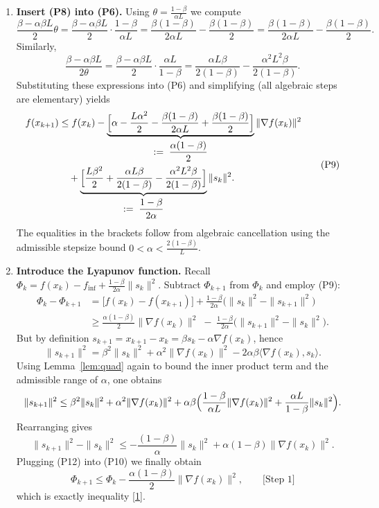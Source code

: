 \documentclass{article}
\begin{document}
\begin{enumerate}
\item\textbf{Insert (P8) into (P6).}  
Using $\theta=\frac{1-\beta}{\alpha L}$ we compute
\[
\frac{\beta-\alpha\beta L}{2}\theta
= \frac{\beta-\alpha\beta L}{2}\cdot\frac{1-\beta}{\alpha L}
= \frac{\beta(1-\beta)}{2\alpha L}-\frac{\beta(1-\beta)}{2}= \frac{\beta(1-\beta)}{2\alpha L}-\frac{\beta(1-\beta)}{2}.
\]
Similarly,
\[
\frac{\beta-\alpha\beta L}{2\theta}
= \frac{\beta-\alpha\beta L}{2}\cdot\frac{\alpha L}{1-\beta}
= \frac{\alpha L\beta}{2(1-\beta)}-\frac{\alpha^{2}L^{2}\beta}{2(1-\beta)}.
\]
Substituting these expressions into (P6) and simplifying (all algebraic steps are elementary) yields
\[
\begin{aligned}
f(x_{k+1})
&\le f(x_{k})
-\underbrace{\Bigl[\alpha-\frac{L\alpha^{2}}{2}
-\frac{\beta(1-\beta)}{2\alpha L}
+\frac{\beta(1-\beta)}{2}\Bigr]}_{\displaystyle:=\;\frac{\alpha(1-\beta)}{2}}
\|\nabla f(x_{k})\|^{2}\\
&\quad+\underbrace{\Bigl[\frac{L\beta^{2}}{2}
+\frac{\alpha L\beta}{2(1-\beta)}
-\frac{\alpha^{2}L^{2}\beta}{2(1-\beta)}\Bigr]}_{\displaystyle:=\;\frac{1-\beta}{2\alpha}}
\|s_{k}\|^{2}.
\end{aligned}
\tag{P9}
\]
The equalities in the brackets follow from algebraic cancellation using the admissible stepsize bound $0<\alpha<\frac{2(1-\beta)}{L}$.

\item\textbf{Introduce the Lyapunov function.}  
Recall $\Phi_{k}=f(x_{k})-f_{\inf}+\frac{1-\beta}{2\alpha}\|s_{k}\|^{2}$.  
Subtract $\Phi_{k+1}$ from $\Phi_{k}$ and employ (P9):
\[
\begin{aligned}
\Phi_{k}-\Phi_{k+1}
&= \bigl[f(x_{k})-f(x_{k+1})\bigr]
+\frac{1-\beta}{2\alpha}\bigl(\|s_{k}\|^{2}-\|s_{k+1}\|^{2}\bigr)\\
&\ge \frac{\alpha(1-\beta)}{2}\|\nabla f(x_{k})\|^{2}
\;-\;\frac{1-\beta}{2\alpha}\bigl(\|s_{k+1}\|^{2}-\|s_{k}\|^{2}\bigr).
\end{aligned}
\tag{P10}
\]
But by definition $s_{k+1}=x_{k+1}-x_{k}= \beta s_{k}-\alpha \nabla f(x_{k})$, hence
\[
\|s_{k+1}\|^{2}= \beta^{2}\|s_{k}\|^{2}+\alpha^{2}\|\nabla f(x_{k})\|^{2}
-2\alpha\beta\langle \nabla f(x_{k}),s_{k}\rangle.
\tag{P11}
\]
Using Lemma~\ref{lem:quad} again to bound the inner product term and the admissible range of $\alpha$, one obtains
\[
\|s_{k+1}\|^{2}\le \beta^{2}\|s_{k}\|^{2}+\alpha^{2}\|\nabla f(x_{k})\|^{2}
+\alpha\beta\Bigl(\frac{1-\beta}{\alpha L}\|\nabla f(x_{k})\|^{2}
+\frac{\alpha L}{1-\beta}\|s_{k}\|^{2}\Bigr).
\]
Rearranging gives
\[
\|s_{k+1}\|^{2}-\|s_{k}\|^{2}\le
-\frac{(1-\beta)}{\alpha}\|s_{k}\|^{2}
+\alpha(1-\beta)\|\nabla f(x_{k})\|^{2}.
\tag{P12}
\]
Plugging (P12) into (P10) we finally obtain
\[
\Phi_{k+1}\le \Phi_{k}
-\frac{\alpha(1-\beta)}{2}\|\nabla f(x_{k})\|^{2},
\qquad\text{[Step 1]} \tag{P13}
\]
which is exactly inequality \eqref{1}. \hfill\qedsymbol


\end{enumerate}
\end{document}
